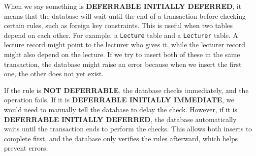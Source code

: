 \documentclass{article}
\begin{document}
\task{}
When we say something is \textbf{DEFERRABLE INITIALLY DEFERRED}, it means that the database will wait until the end of a transaction before checking certain rules, such as foreign key constraints. This is useful when two tables depend on each other. For example, a \texttt{Lecture} table and a \texttt{Lecturer} table. A lecture record might point to the lecturer who gives it, while the lecturer record might also depend on the lecture. If we try to insert both of these in the same transaction, the database might raise an error because when we insert the first one, the other does not yet exist.


If the rule is \textbf{NOT DEFERRABLE}, the database checks immediately, and the operation fails. If it is \textbf{DEFERRABLE INITIALLY IMMEDIATE}, we would need to manually tell the database to delay the check. However, if it is \textbf{DEFERRABLE INITIALLY DEFERRED}, the database automatically waits until the transaction ends to perform the checks. This allows both inserts to complete first, and the database only verifies the rules afterward, which helps prevent errors.
\end{document}
